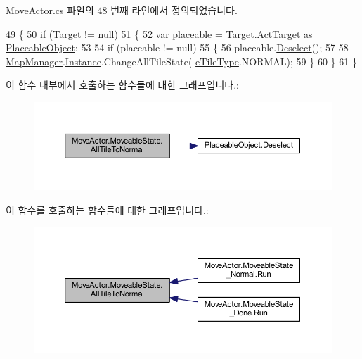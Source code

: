 Move\+Actor.\+cs 파일의 48 번째 라인에서 정의되었습니다.


\begin{DoxyCode}
49         \{
50             \textcolor{keywordflow}{if} (\hyperlink{class_m_c_n_1_1_state_a93ba2fd920292031bd6e65b1dc505cb3}{Target} != null)
51             \{
52                 var placeable = \hyperlink{class_m_c_n_1_1_state_a93ba2fd920292031bd6e65b1dc505cb3}{Target}.ActTarget as \hyperlink{class_placeable_object}{PlaceableObject};
53 
54                 \textcolor{keywordflow}{if} (placeable != null)
55                 \{
56                     placeable.\hyperlink{class_placeable_object_a0c1248b1f9981ddbf68e6f70a6498f3d}{Deselect}();
57 
58                     \hyperlink{class_map_manager}{MapManager}.\hyperlink{class_m_c_n_1_1_mono_singletone_aa50c027cca64cf4ad30c1ee5c83e0b78}{Instance}.ChangeAllTileState(
      \hyperlink{_tile_8cs_a271bc07be325bca511bcb747e0ff2fda}{eTileType}.NORMAL);
59                 \}
60             \}
61         \}
\end{DoxyCode}


이 함수 내부에서 호출하는 함수들에 대한 그래프입니다.\+:\nopagebreak
\begin{figure}[H]
\begin{center}
\leavevmode
\includegraphics[width=350pt]{class_move_actor_1_1_moveable_state_a2da1a565b497b15a220f5ff494ec7a1e_cgraph}
\end{center}
\end{figure}




이 함수를 호출하는 함수들에 대한 그래프입니다.\+:\nopagebreak
\begin{figure}[H]
\begin{center}
\leavevmode
\includegraphics[width=350pt]{class_move_actor_1_1_moveable_state_a2da1a565b497b15a220f5ff494ec7a1e_icgraph}
\end{center}
\end{figure}


